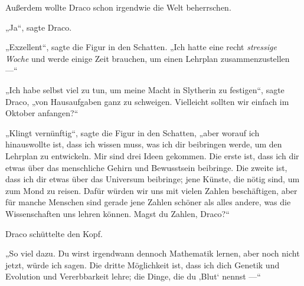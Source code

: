 Außerdem wollte Draco schon irgendwie die Welt beherrschen.

„Ja“, sagte Draco.

„Exzellent“, sagte die Figur in den Schatten.
„Ich hatte eine recht \emph{stressige Woche} und werde einige Zeit brauchen, um einen Lehrplan zusammenzustellen —“

„Ich habe selbst viel zu tun, um meine Macht in Slytherin zu festigen“, sagte Draco, „von Hausaufgaben ganz zu schweigen. Vielleicht sollten wir einfach im Oktober anfangen?“

„Klingt vernünftig“, sagte die Figur in den Schatten, „aber worauf ich hinauswollte ist, dass ich wissen muss, was ich dir beibringen werde, um den Lehrplan zu entwickeln. Mir sind drei Ideen gekommen. Die erste ist, dass ich dir etwas über das menschliche Gehirn und Bewusstsein beibringe. Die zweite ist, dass ich dir etwas über das Universum beibringe; jene Künste, die nötig sind, um zum Mond zu reisen. Dafür würden wir uns mit vielen Zahlen beschäftigen, aber für manche Menschen sind gerade jene Zahlen schöner als alles andere, was die Wissenschaften uns lehren können. Magst du Zahlen, Draco?“

Draco schüttelte den Kopf.

„So viel dazu. Du wirst irgendwann dennoch Mathematik lernen, aber noch nicht jetzt, würde ich sagen. Die dritte Möglichkeit ist, dass ich dich Genetik und Evolution und Vererbbarkeit lehre; die Dinge, die du ‚Blut‘ nennst —“

